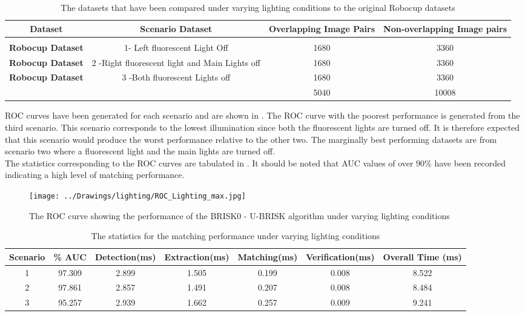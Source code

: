 \documentclass[11pt]{report}
\begin{document}
\begin{table}
\caption{The datasets that have been compared under varying lighting conditions
to the original Robocup datasets}
\footnotesize
\begin{tabular}{|c|c|c|c|}
\hline 
\textbf{Dataset} & \textbf{Scenario Dataset} & \textbf{Overlapping Image Pairs} & \textbf{Non-overlapping Image pairs}\tabularnewline
\hline 
\hline 
 &  &  & \tabularnewline
\hline 
\textbf{Robocup Dataset} & 1- Left fluorescent Light Off & 1680 & 3360\tabularnewline
\hline 
\textbf{Robocup Dataset} & 2 -Right fluorescent light and Main Lights off & 1680 & 3360\tabularnewline
\hline 
\textbf{Robocup Dataset} & 3 -Both fluorescent Lights off & 1680 & 3360\tabularnewline
\hline 
 &  & 5040 & 10008\tabularnewline
\hline 
\end{tabular}

\label{tab:datasetLighting}
\end{table}

ROC curves have been generated for each scenario and are shown in . The ROC curve with the poorest performance is generated from the third scenario. This scenario corresponds to the lowest illumination since both the fluorescent lights are turned off. It is therefore expected that this scenario would produce the worst performance relative to the other two. The marginally best performing datasets are from scenario two where a fluorescent light and the main lights are turned off. \\

The statistics corresponding to the ROC curves are tabulated in . It should be noted that AUC values of over $90\%$ have been recorded indicating a high level of matching performance. \\


\begin{figure}[h!] 
  \centering
    \texttt{[image: ../Drawings/lighting/ROC\_Lighting\_max.jpg]}
    \caption{The ROC curve showing the performance of the BRISK0 - U-BRISK algorithm under varying lighting conditions}
    \label{fig:rocLighting}
\end{figure}

\begin{table}
\caption{The statistics for the matching performance under varying lighting conditions}
\begin{tabular}{|c|c|c|c|c|c|c|}
\hline 
Scenario & \% AUC & Detection(ms) & Extraction(ms) & Matching(ms) & Verification(ms) & Overall Time (ms)\tabularnewline
\hline 
\hline 
1 & 97.309 & 2.899 & 1.505 & 0.199 & 0.008 & 8.522\tabularnewline
\hline 
2 & 97.861 & 2.857 & 1.491 & 0.207 & 0.008 & 8.484\tabularnewline
\hline 
3 & 95.257 & 2.939 & 1.662 & 0.257 & 0.009 & 9.241\tabularnewline
\hline 
\end{tabular}
\label{tab:lightingStats}
\end{table}
\end{document}
